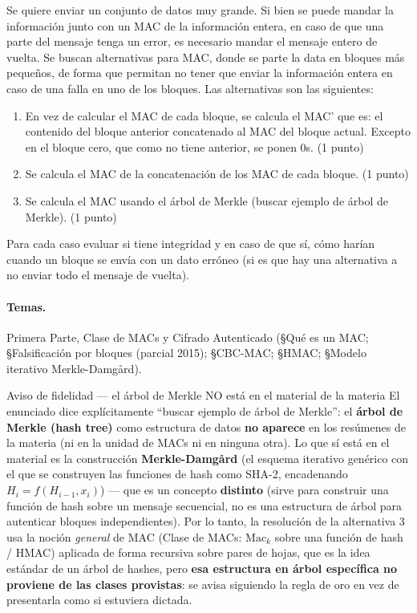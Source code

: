 \begin{consigna}
Se quiere enviar un conjunto de datos muy grande. Si bien se puede mandar la
información junto con un MAC de la información entera, en caso de que una parte del
mensaje tenga un error, es necesario mandar el mensaje entero de vuelta. Se buscan
alternativas para MAC, donde se parte la data en bloques más pequeños, de forma que
permitan no tener que enviar la información entera en caso de una falla en uno de los
bloques. Las alternativas son las siguientes:
\begin{enumerate}
  \item[1.] En vez de calcular el MAC de cada bloque, se calcula el MAC' que es: el
  contenido del bloque anterior concatenado al MAC del bloque actual. Excepto en el
  bloque cero, que como no tiene anterior, se ponen 0s. (1 punto)
  \item[2.] Se calcula el MAC de la concatenación de los MAC de cada bloque. (1 punto)
  \item[3.] Se calcula el MAC usando el árbol de Merkle (buscar ejemplo de árbol de
  Merkle). (1 punto)
\end{enumerate}
Para cada caso evaluar si tiene integridad y en caso de que sí, cómo harían cuando un
bloque se envía con un dato erróneo (si es que hay una alternativa a no enviar todo el
mensaje de vuelta).
\end{consigna}

\paragraph{Temas.}
Primera Parte, Clase de MACs y Cifrado Autenticado (\S Qué es un MAC; \S Falsificación
por bloques (parcial 2015); \S CBC-MAC; \S HMAC; \S Modelo iterativo Merkle-Damgård).

\begin{warnbox}{Aviso de fidelidad --- el árbol de Merkle NO está en el material de la materia}
El enunciado dice explícitamente ``buscar ejemplo de árbol de Merkle'': el \textbf{árbol
de Merkle (hash tree)} como estructura de datos \textbf{no aparece} en los resúmenes de
la materia (ni en la unidad de MACs ni en ninguna otra). Lo que sí está en el material es
la construcción \textbf{Merkle-Damgård} (el esquema iterativo genérico con el que se
construyen las funciones de hash como SHA-2, encadenando $H_i=f(H_{i-1},x_i)$) --- que es
un concepto \textbf{distinto} (sirve para construir una función de hash sobre un mensaje
secuencial, no es una estructura de árbol para autenticar bloques independientes). Por lo
tanto, la resolución de la alternativa 3 usa la noción \emph{general} de MAC (Clase de
MACs: $\mathrm{Mac}_k$ sobre una función de hash / HMAC) aplicada de forma recursiva sobre
pares de hojas, que es la idea estándar de un árbol de hashes, pero \textbf{esa
estructura en árbol específica no proviene de las clases provistas}: se avisa siguiendo
la regla de oro en vez de presentarla como si estuviera dictada.
\end{warnbox}

